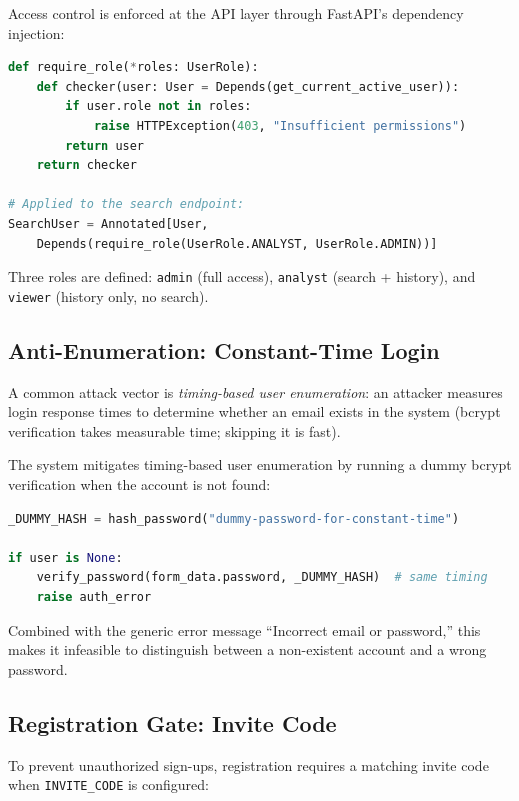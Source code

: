 Access control is enforced at the API layer through FastAPI's dependency
injection:

\begin{lstlisting}[language=Python,caption={RBAC dependency injection.}]
def require_role(*roles: UserRole):
    def checker(user: User = Depends(get_current_active_user)):
        if user.role not in roles:
            raise HTTPException(403, "Insufficient permissions")
        return user
    return checker

# Applied to the search endpoint:
SearchUser = Annotated[User,
    Depends(require_role(UserRole.ANALYST, UserRole.ADMIN))]
\end{lstlisting}

Three roles are defined: \texttt{admin} (full access), \texttt{analyst}
(search + history), and \texttt{viewer} (history only, no search).

\subsection{Anti-Enumeration: Constant-Time Login}

A common attack vector is \emph{timing-based user enumeration}: an attacker
measures login response times to determine whether an email exists in the
system (bcrypt verification takes measurable time; skipping it is fast).

The system mitigates timing-based user enumeration by running a dummy bcrypt
verification when the account is not found:

\begin{lstlisting}[language=Python,caption={Constant-time login defense.}]
_DUMMY_HASH = hash_password("dummy-password-for-constant-time")

if user is None:
    verify_password(form_data.password, _DUMMY_HASH)  # same timing
    raise auth_error
\end{lstlisting}

Combined with the generic error message ``Incorrect email or password,'' this
makes it infeasible to distinguish between a non-existent account and a wrong
password.

\subsection{Registration Gate: Invite Code}

To prevent unauthorized sign-ups, registration requires a matching invite
code when \texttt{INVITE\_CODE} is configured:

